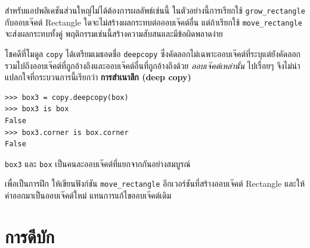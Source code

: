 
สำหรับแอปพลิเคชันส่วนใหญ่ไม่ได้ต้องการผลลัพธ์เช่นนี้ ในตัวอย่างนี้การเรียกใช้  \verb"grow_rectangle" 
กับออบเจ๊คต์ Rectangle ใดจะไม่สร้างผลกระทบต่อออบเจ๊คต์อื่น 
แต่ถ้าเรียกใช้ \verb"move_rectangle" จะส่งผลกระทบทั้งคู่ พฤติกรรมเช่นนี้สร้างความสับสนและมีข้อผิดพลาดง่าย


โชคดีที่โมดูล {\tt copy} ได้เตรียมเมธอดชื่อ {\tt deepcopy} ซึ่งคัดลอกไม่เฉพาะออบเจ๊คต์ที่ระบุแต่ยังคัดลอกรวมไปถึงออบเจ๊คต์ที่ถูกอ้างถึงและออบเจ๊คต์อื่นที่ถูกอ้างถึงด้วย {\em ออบเจ๊คต์เหล่านั้น} ไปเรื่อยๆ 
จึงไม่น่าแปลกใจที่กระบวนการนี้เรียกว่า {\bf การสำเนาลึก (deep copy)}

\begin{verbatim}
>>> box3 = copy.deepcopy(box)
>>> box3 is box
False
>>> box3.corner is box.corner
False
\end{verbatim}
%

{\tt box3} และ {\tt box} เป็นคนละออบเจ๊คต์ที่แยกจากกันอย่างสมบูรณ์


เพื่อเป็นการฝึก ให้เขียนฟังก์ชัน \verb"move_rectangle" อีกเวอร์ชันที่สร้างออบเจ๊คต์ Rectangle และให้ค่าออกมาเป็นออบเจ๊คต์ใหม่ แทนการแก้ไขออบเจ๊คต์เดิม

\section{การดีบัก}
\label{hasattr}


